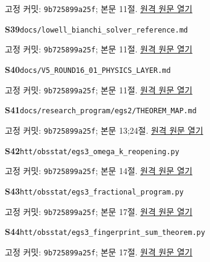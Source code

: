 \documentclass[11pt,a4paper]{article}
\begin{document}
{\small 고정 커밋: \texttt{9b725899a25f}; 본문 11절. \href{https://github.com/cosmosapjw-quantum/htt_base/blob/9b725899a25fa410e7c3686ce36afaa667d14646/docs/V5_ROUND15_P1_PSTF_DERIVATION_OPUS.md}{원격 원문 열기}}\par
\hypertarget{src:S39}{}\textbf{S39}\quad \nolinkurl{docs/lowell_bianchi_solver_reference.md}\par
{\small 고정 커밋: \texttt{9b725899a25f}; 본문 11절. \href{https://github.com/cosmosapjw-quantum/htt_base/blob/9b725899a25fa410e7c3686ce36afaa667d14646/docs/lowell_bianchi_solver_reference.md}{원격 원문 열기}}\par
\hypertarget{src:S40}{}\textbf{S40}\quad \nolinkurl{docs/V5_ROUND16_01_PHYSICS_LAYER.md}\par
{\small 고정 커밋: \texttt{9b725899a25f}; 본문 11절. \href{https://github.com/cosmosapjw-quantum/htt_base/blob/9b725899a25fa410e7c3686ce36afaa667d14646/docs/V5_ROUND16_01_PHYSICS_LAYER.md}{원격 원문 열기}}\par
\hypertarget{src:S41}{}\textbf{S41}\quad \nolinkurl{docs/research_program/egs2/THEOREM_MAP.md}\par
{\small 고정 커밋: \texttt{9b725899a25f}; 본문 13;24절. \href{https://github.com/cosmosapjw-quantum/htt_base/blob/9b725899a25fa410e7c3686ce36afaa667d14646/docs/research_program/egs2/THEOREM_MAP.md}{원격 원문 열기}}\par
\hypertarget{src:S42}{}\textbf{S42}\quad \nolinkurl{htt/obsstat/egs3_omega_k_reopening.py}\par
{\small 고정 커밋: \texttt{9b725899a25f}; 본문 14절. \href{https://github.com/cosmosapjw-quantum/htt_base/blob/9b725899a25fa410e7c3686ce36afaa667d14646/htt/obsstat/egs3_omega_k_reopening.py}{원격 원문 열기}}\par
\hypertarget{src:S43}{}\textbf{S43}\quad \nolinkurl{htt/obsstat/egs3_fractional_program.py}\par
{\small 고정 커밋: \texttt{9b725899a25f}; 본문 17절. \href{https://github.com/cosmosapjw-quantum/htt_base/blob/9b725899a25fa410e7c3686ce36afaa667d14646/htt/obsstat/egs3_fractional_program.py}{원격 원문 열기}}\par
\hypertarget{src:S44}{}\textbf{S44}\quad \nolinkurl{htt/obsstat/egs3_fingerprint_sum_theorem.py}\par
{\small 고정 커밋: \texttt{9b725899a25f}; 본문 17절. \href{https://github.com/cosmosapjw-quantum/htt_base/blob/9b725899a25fa410e7c3686ce36afaa667d14646/htt/obsstat/egs3_fingerprint_sum_theorem.py}{원격 원문 열기}}\par
\end{document}
